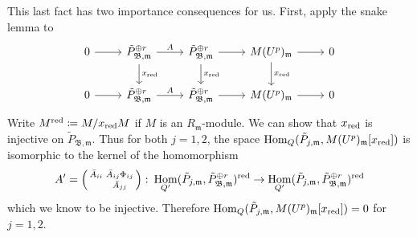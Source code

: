 \documentclass[leqno]{amsart}
\theoremstyle{definition}
\theoremstyle{remark}
\newcommand{\smat}[1]{\left(\begin{smallmatrix} #1 \end{smallmatrix}\right)}
\DeclareMathOperator{\Hom}{Hom}
\newcommand{\fm}{\mathfrak{m}}
\newcommand{\B}{\mathfrak B} %
\newcommand{\red}{\textnormal{red}}
\newcommand{\xx}{x_\textnormal{red}}
\begin{document}
This last fact has two importance consequences for us.
First, apply the snake lemma to
\begin{equation*}
    \begin{tikzcd}
    0 \arrow[r] & 
    \tilde{P}_{\B,\fm}^{\oplus r} 
	\arrow[d,"\xx"] \arrow[r,"A"] & 
	\tilde{P}_{\B,\fm}^{\oplus r} 
	\arrow[d,"\xx"] \arrow[r] & 
	M(U^p)_{\fm}
    \arrow[d,"\xx"]  \arrow[r] & 0 \\ 
    0 \arrow[r] & 
    \tilde{P}_{\B,\fm}^{\oplus r}
	\arrow[r,"A"] & 
    \tilde{P}_{\B,\fm}^{\oplus r}
	\arrow[r] &
    M(U^p)_{\fm} 
    \arrow[r] & 0 
    \end{tikzcd}
\end{equation*}
Write $M^\red\coloneqq M/\xx M$ if $M$ is an $R_\fm$-module.
We can show that $\xx$ is injective on $\tilde{P}_{\B,\fm}$.
Thus for both $j=1,2$, the space
$\Hom_{Q}(\tilde{P}_{j,\fm}, M(U^p)_{\fm}[\xx])$
is isomorphic to the kernel of the homomorphism
\begin{equation*}
	A'=\smat{\bar{A}_{ii}& \bar{A}_{ij}\Phi_{ij}\\& \bar{A}_{jj}}\colon 
	\Hom_{Q'}(\tilde{P}_{j,\fm},\tilde{P}_{\B,\fm}^{\oplus r})^{\red}\to
	\Hom_{Q'}(\tilde{P}_{j,\fm},\tilde{P}_{\B,\fm}^{\oplus r})^{\red}
\end{equation*}
which we know to be injective.
Therefore $\Hom_{Q}(\tilde{P}_{j,\fm}, M(U^p)_{\fm}[\xx])=0$
for $j=1,2$.
\end{document}
